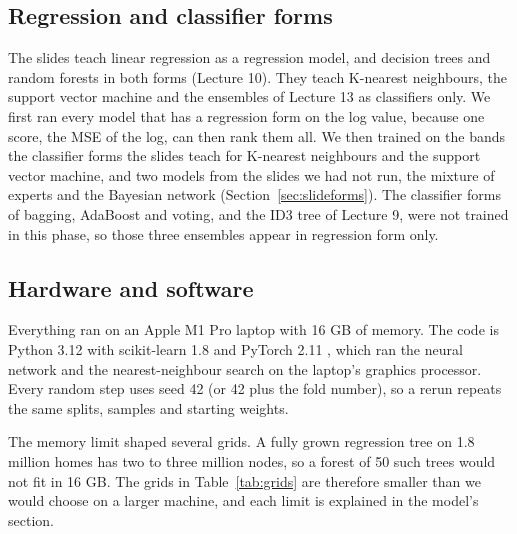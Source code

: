 \documentclass[sigconf,nonacm,10pt]{acmart}
\begin{document}
\subsection{Regression and classifier forms}
\label{sec:forms}
The slides teach linear regression as a regression model, and decision trees and random forests in both forms (Lecture 10). They teach K-nearest neighbours, the support vector machine and the ensembles of Lecture 13 as classifiers only. We first ran every model that has a regression form on the log value, because one score, the MSE of the log, can then rank them all. We then trained on the bands the classifier forms the slides teach for K-nearest neighbours and the support vector machine, and two models from the slides we had not run, the mixture of experts and the Bayesian network (Section~\ref{sec:slideforms}). The classifier forms of bagging, AdaBoost and voting, and the ID3 tree of Lecture 9, were not trained in this phase, so those three ensembles appear in regression form only.

\subsection{Hardware and software}
Everything ran on an Apple M1 Pro laptop with 16 GB of memory. The code is Python 3.12 with scikit-learn 1.8 \cite{pedregosa2011} and PyTorch 2.11 \cite{paszke2019}, which ran the neural network and the nearest-neighbour search on the laptop's graphics processor. Every random step uses seed 42 (or 42 plus the fold number), so a rerun repeats the same splits, samples and starting weights.

The memory limit shaped several grids. A fully grown regression tree on 1.8 million homes has two to three million nodes, so a forest of 50 such trees would not fit in 16 GB. The grids in Table~\ref{tab:grids} are therefore smaller than we would choose on a larger machine, and each limit is explained in the model's section.
\end{document}
